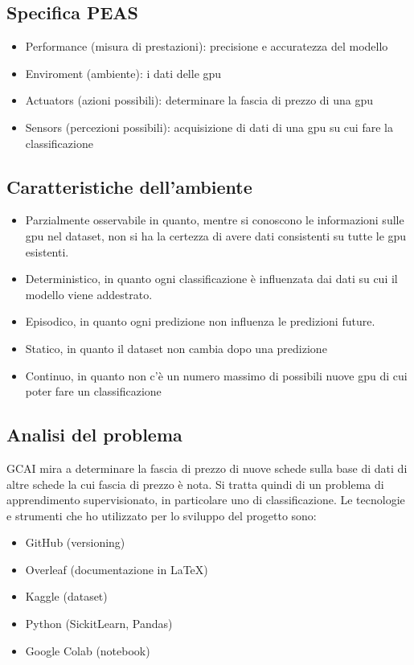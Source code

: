 \documentclass{article}
\begin{document}
    \subsection{Specifica PEAS}
        \begin{itemize}
        \item Performance (misura di prestazioni): precisione e accuratezza del modello
        \item Enviroment (ambiente): i dati delle gpu 
        \item Actuators (azioni possibili): determinare la fascia di prezzo di una gpu
        \item Sensors (percezioni possibili): acquisizione di dati di una gpu su cui fare la classificazione
        \end{itemize}
    \subsection{Caratteristiche dell'ambiente}
        \begin{itemize}
        \item Parzialmente osservabile in quanto, mentre si conoscono le informazioni sulle gpu nel dataset, 
        non si ha la certezza di avere dati consistenti su tutte le gpu esistenti.
        \item Deterministico, in quanto ogni classificazione è influenzata dai dati su cui il modello viene addestrato.
        \item Episodico, in quanto ogni predizione non influenza le predizioni future. 
        \item Statico, in quanto il dataset non cambia dopo una predizione
        \item Continuo, in quanto non c'è un numero massimo di possibili nuove gpu di cui poter fare un classificazione
        \end{itemize}
    
    \subsection{Analisi del problema}
    GCAI mira a determinare la fascia di prezzo di nuove schede sulla base di dati di altre schede la cui fascia di prezzo è nota. 
    Si tratta quindi di un problema di apprendimento supervisionato, in particolare uno di classificazione.
    Le tecnologie e strumenti che ho utilizzato per lo sviluppo del progetto sono:
        \begin{itemize}      
        \item GitHub (versioning)
        \item Overleaf (documentazione in \LaTeX)
        \item Kaggle (dataset)
        \item Python (SickitLearn, Pandas)
        \item Google Colab (notebook)
        \end{itemize}
\end{document}
